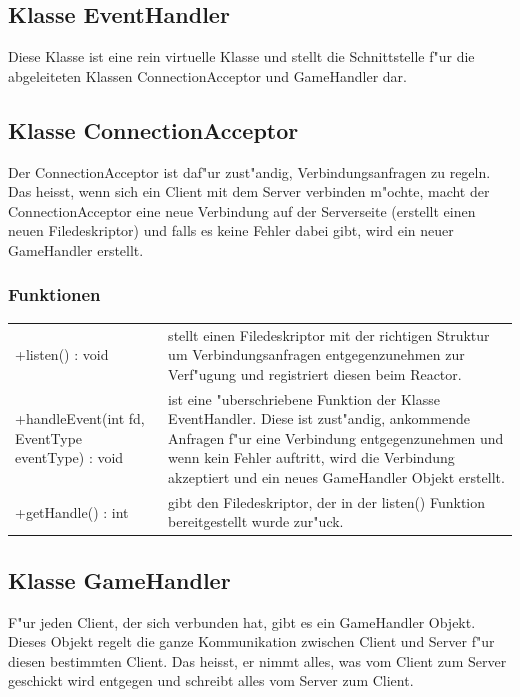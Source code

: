 \subsection{Klasse EventHandler}
Diese Klasse ist eine rein virtuelle Klasse und stellt die Schnittstelle f"ur die abgeleiteten Klassen ConnectionAcceptor und GameHandler dar.

\subsection{Klasse ConnectionAcceptor}
Der ConnectionAcceptor ist daf"ur zust"andig, Verbindungsanfragen zu regeln. Das heisst, wenn sich ein Client mit dem Server verbinden m"ochte,
macht der ConnectionAcceptor eine neue Verbindung auf der Serverseite (erstellt einen neuen Filedeskriptor)
und falls es keine Fehler dabei gibt, wird ein neuer GameHandler erstellt.
\subsubsection{Funktionen}
\begin{tabular}{p{50mm}p{90mm}}
	+listen() : void & stellt einen Filedeskriptor mit der richtigen Struktur um Verbindungsanfragen entgegenzunehmen zur Verf"ugung und 
	registriert diesen beim Reactor. \\
	+handleEvent(int fd, EventType eventType) : void & ist eine "uberschriebene Funktion der Klasse EventHandler. Diese ist zust"andig, ankommende
	Anfragen f"ur eine Verbindung entgegenzunehmen und wenn kein Fehler auftritt, wird die Verbindung akzeptiert und ein neues GameHandler Objekt erstellt. \\
	+getHandle() : int & gibt den Filedeskriptor, der in der listen() Funktion bereitgestellt wurde zur"uck. \\
\end{tabular}

\subsection{Klasse GameHandler}
F"ur jeden Client, der sich verbunden hat, gibt es ein GameHandler Objekt. Dieses Objekt regelt die ganze Kommunikation zwischen Client und
Server f"ur diesen bestimmten Client. Das heisst, er nimmt alles, was vom Client zum Server geschickt wird entgegen und schreibt alles
vom Server zum Client. 
